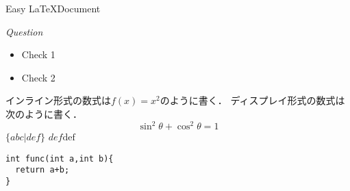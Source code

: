 \documentclass[11pt]{jarticle}
\begin{document}
Easy \LaTeX  Document
\begin{center}
\large \em Question
\end{center}
\begin{itemize}
\item Check 1
\item Check 2
\end{itemize}
インライン形式の数式は$f(x)=x^2$のように書く．
ディスプレイ形式の数式は次のように書く．
\begin{equation}
\sin^2 \theta + \cos^2 \theta = 1
\end{equation}
$\{ abc | def \}$
$ def \mbox{def} $

\begin{verbatim}
int func(int a,int b){
  return a+b;
}
\end{verbatim}
\end{document}
